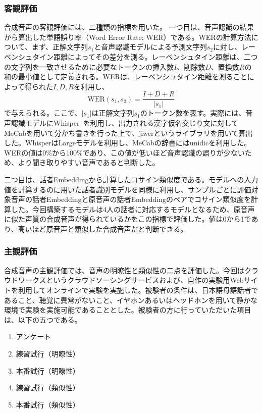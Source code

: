 \documentclass[12pt]{jarticle}
\numberwithin{equation}{section}    %
\numberwithin{figure}{section}      %
\numberwithin{table}{section}      %
\begin{document}
\subsubsection{客観評価}
合成音声の客観評価には、二種類の指標を用いた。
一つ目は、音声認識の結果から算出した単語誤り率（Word Error Rate; WER）である。WERの計算方法について、まず、正解文字列$s_{1}$と音声認識モデルによる予測文字列$s_{2}$に対し、レーベンシュタイン距離によってその差分を測る。レーベンシュタイン距離は、二つの文字列を一致させるために必要なトークンの挿入数$I$、削除数$D$、置換数$R$の和の最小値として定義される。WERは、レーベンシュタイン距離を測ることによって得られた$I, D, R$を利用し、
\begin{equation}
    \text{WER}(s_{1}, s_{2}) = \frac{I + D + R}{|s_{1}|}
\end{equation}
で与えられる。ここで、$|s_{1}|$は正解文字列$s_{1}$のトークン数を表す。実際には、音声認識モデルにWhisper~\cite{radford2023robust}を利用し、出力される漢字仮名交じり文に対してMeCabを用いて分かち書きを行った上で、jiwerというライブラリを用いて算出した。WhisperはLargeモデルを利用し、MeCabの辞書にはunidicを利用した。WERの値は0\%から100\%であり、この値が低いほど音声認識の誤りが少ないため、より聞き取りやすい音声であると判断した。

二つ目は、話者Embeddingから計算したコサイン類似度である。モデルへの入力値を計算するのに用いた話者識別モデルを同様に利用し、サンプルごとに評価対象音声の話者Embeddingと原音声の話者Embeddingのペアでコサイン類似度を計算した。今回構築するモデルは4人の話者に対応するモデルとなるため、原音声に似た声質の合成音声が得られているかをこの指標で評価した。値は0から1であり、高いほど原音声と類似した合成音声だと判断できる。

\subsubsection{主観評価}
合成音声の主観評価では、音声の明瞭性と類似性の二点を評価した。今回はクラウドワークスというクラウドソーシングサービスおよび、自作の実験用Webサイトを利用してオンラインで実験を実施した。被験者の条件は、日本語母語話者であること、聴覚に異常がないこと、イヤホンあるいはヘッドホンを用いて静かな環境で実験を実施可能であることとした。被験者の方に行っていただいた項目は、以下の五つである。
\begin{enumerate}
    \item アンケート
    \item 練習試行（明瞭性）
    \item 本番試行（明瞭性）
    \item 練習試行（類似性）
    \item 本番試行（類似性）
\end{enumerate}
\end{document}
